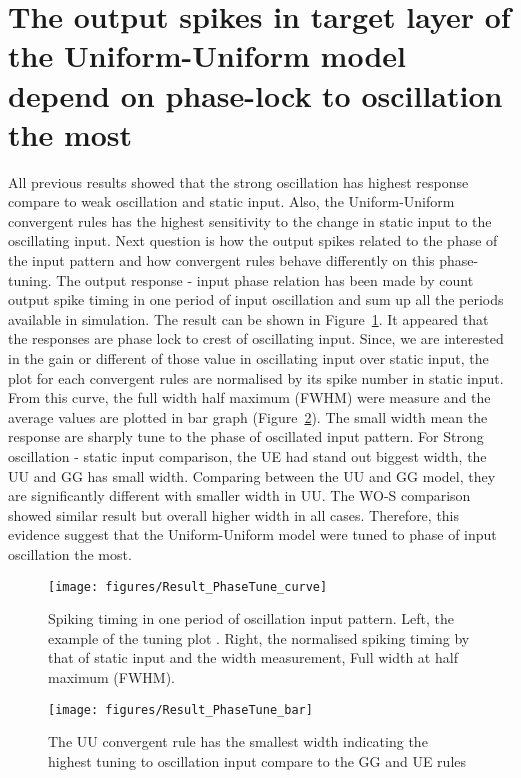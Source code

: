  
\section{The output spikes in target layer of the Uniform-Uniform model depend on phase-lock to oscillation the most}
  All previous results showed that the strong oscillation has highest response compare to weak oscillation and static input. Also, the Uniform-Uniform convergent rules has the highest sensitivity to the change in static input to the oscillating input. 
Next question is how the output spikes related to the phase of the input pattern and how convergent rules behave differently on this phase-tuning. 
The output response - input phase relation has been made by count output spike timing in one period of input oscillation and sum up all the periods available in simulation.  The result can be shown in Figure~\ref{fig:PhaseCurve}. It appeared that the responses are phase lock to crest of oscillating input.
Since, we are interested in the gain or different of those value in oscillating input over static input, the plot for each convergent rules are normalised by its spike number in static input. From this curve, the full width half maximum (FWHM) were measure and the average values are plotted in bar graph (Figure~\ref{fig:PhaseBar}). The small width mean the response are sharply tune to the phase of oscillated input pattern. For Strong oscillation - static input comparison, the UE had stand out biggest width, the UU and GG has small width. Comparing  between the UU and GG model, they are significantly different with smaller width in UU. The WO-S comparison showed similar result but overall higher width in all cases. Therefore, this evidence suggest that the Uniform-Uniform model were tuned to phase of input oscillation the most.




\begin{figure}[!h]
	\centering
	\texttt{[image: figures/Result\_PhaseTune\_curve]}
	\caption{Spiking timing in one period of oscillation input pattern. Left, the example of the tuning plot . Right, the normalised spiking timing by that of static input and the width measurement, Full width at half maximum (FWHM).} 			\label{fig:PhaseCurve}
\end{figure}

\begin{figure}[!h]
	\centering
	\texttt{[image: figures/Result\_PhaseTune\_bar]}
	\caption{The UU convergent rule has the smallest width indicating the highest tuning to oscillation input compare to the GG and UE rules} 
	\label{fig:PhaseBar}
\end{figure}


